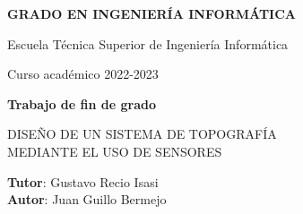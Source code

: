 \thispagestyle{empty}
\vspace{2cm}

\begin{figure}[htb]
  \centerline{}
\end{figure}

\begin{center}
  {\Large {\bf GRADO EN INGENIERÍA INFORMÁTICA}}
  \vspace{5mm}
 
  {\large {Escuela Técnica Superior de Ingeniería Informática}}
  \vspace{5mm}

  {\large {Curso académico 2022-2023}}

  \vspace{1cm}

  {\large {\bf Trabajo de fin de grado}}

  \vspace{2cm}

  {\Large {DISEÑO DE UN SISTEMA DE TOPOGRAFÍA \\
  MEDIANTE EL USO DE SENSORES\\[1cm] }}

  \vspace{5cm}
  {\bf Tutor}: Gustavo Recio Isasi \\
  {\bf Autor}: Juan Guillo Bermejo
\end{center}

\clearpage
\thispagestyle{empty}
